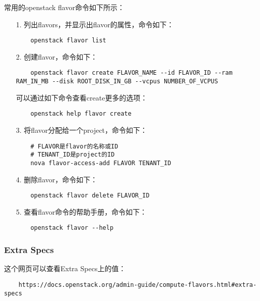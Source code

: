 \documentclass[a4paper,left=1.5cm,right=1.5cm,11pt]{article}
\begin{document}
    常用的openstack flavor命令如下所示：
    \begin{itemize}
        \item[1.] 列出flavors，并显示出flavor的属性，命令如下：
        \begin{lstlisting}
    openstack flavor list
        \end{lstlisting}

        \item[2.] 创建flavor，命令如下：
        \begin{lstlisting}
    openstack flavor create FLAVOR_NAME --id FLAVOR_ID --ram RAM_IN_MB --disk ROOT_DISK_IN_GB --vcpus NUMBER_OF_VCPUS
        \end{lstlisting}

        可以通过如下命令查看create更多的选项：
        \begin{lstlisting}
    openstack help flavor create
        \end{lstlisting}

        \item[3.] 将flavor分配给一个project，命令如下：
        \begin{lstlisting}
    # FLAVOR是flavor的名称或ID
    # TENANT_ID是project的ID
    nova flavor-access-add FLAVOR TENANT_ID
        \end{lstlisting}

        \item[4.] 删除flavor，命令如下：
        \begin{lstlisting}
    openstack flavor delete FLAVOR_ID
        \end{lstlisting}

        \item[5.] 查看flavor命令的帮助手册，命令如下：
        \begin{lstlisting}
    openstack flavor --help
        \end{lstlisting}
    \end{itemize}

\subsubsection{Extra Specs}
    这个网页可以查看Extra Specs上的值：
    \begin{lstlisting}
    https://docs.openstack.org/admin-guide/compute-flavors.html#extra-specs
    \end{lstlisting}
\end{document}
